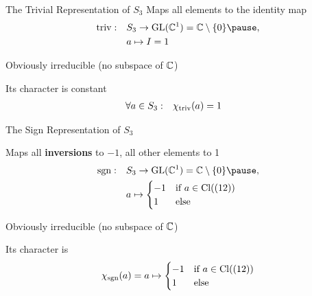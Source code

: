 \begin{frame}{The Trivial Representation of $S_3$}
    \large
    Maps all elements to the identity map
    \pause
    \begin{align*}
        \triv: \quad & S_3 \to \GL(\C^1) = \C \setminus \{0\} \pause , \\
        & a \mapsto I = 1
    \end{align*}

    \pause
    Obviously irreducible (no subspace of $\mathbb{C}$)

    \pause
    Its character is constant
    \begin{align*}
        \forall a \in S_3: \quad & \chi_{\operatorname{triv}}(a) = 1
    \end{align*}
\end{frame}

\begin{frame}{The Sign Representation of $S_3$}
    \large
    
    Maps all \textbf{inversions} to $-1$, all other elements to 1
    \pause
    \begin{align*}
        \sgn: \quad & S_3 \to \GL(\C^1) = \C \setminus \{0\} \pause , \\
        & a \mapsto \begin{cases}
            -1 & \text{if } a \in \Cl((12)) \\
            1 & \text{else}
        \end{cases}
    \end{align*}

    \pause
    Obviously irreducible (no subspace of $\mathbb{C}$)
    
    \pause
    Its character is
    \begin{align*}
        \chi_{\operatorname{sgn}}(a) = a \mapsto \begin{cases}
            -1 & \text{if } a \in \operatorname{Cl}((12)) \\
            1 & \text{else}
        \end{cases}
    \end{align*}
\end{frame}

